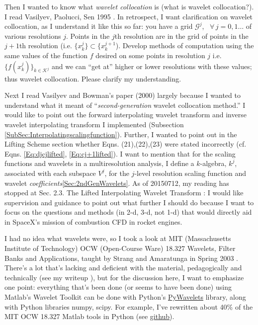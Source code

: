 \documentclass[twoside]{amsart}
\theoremstyle{plain}
\theoremstyle{definition}
\theoremstyle{remark}
\numberwithin{equation}{section}
\begin{document}
Then I wanted to know what \emph{wavelet collocation} is (what is wavelet collocation?).  I read Vasilyev, Paolucci, Sen 1995 \cite{OVasilyevSPaolucciMSen1995}.  In retrospect, I want clarification on wavelet collocation, as I understand it like this so far: you have a grid $\mathcal{G}^{j}$, \, $\forall \, j = 0 , 1 \dots $ of various resolutions $j$.  Points in the $j$th resolution are in the grid of points in the $j+1$th resolution (i.e. $\lbrace x^{j}_k \rbrace \subset \lbrace x^{j+1}_k$).  Develop methods of computation using the same values of the function $f$ desired on some points in resolution $j$ i.e. $\lbrace f(x^j_k) \rbrace_{k\in\mathcal{K}^j}$ and we can ``get at'' higher or lower resolutions with these values; thus wavelet collocation. Please clarify my understanding.  

Next I read Vasilyev and Bowman's paper (2000) \cite{OVasilyevCBowman2000} largely because I wanted to understand what it meant of ``\emph{second-generation} wavelet collocation method.''  I would like to point out the forward interpolating wavelet transform and inverse wavelet interpolating transform I implemented (Subsection \ref{SubSec:Interpolatingscalingfunction}).  Further, I wanted to point out in the Lifting Scheme section whether Eqns. (21),(22),(23) \cite{OVasilyevCBowman2000} were stated incorrectly (cf. Eqns. \ref{Eq:djcjlifted}, \ref{Eq:cj+1lifted}).  I want to mention that for the scaling functions and wavelets in a multiresolution analysis, I define a $k$-algebra, $k^j$, associated with each subspace $V^j$, for the $j$-level resolution scaling function and wavelet \emph{coefficients}\ref{Sec:2ndGenWavelets}.  As of 20150712, my reading has stopped at Sec. 2.3. The Lifted Interpolating Wavelet Transform \cite{OVasilyevCBowman2000}: I would like supervision and guidance to point out what further I should do because I want to focus on the questions and methods (in 2-d, 3-d, not 1-d) that would directly aid in SpaceX's mission of combustion CFD in rocket engines.   

I had no idea what wavelets were, so I took a look at MIT (Massachusetts Institute of Technology) OCW (Open-Course Ware) 18.327 Wavelets, Filter Banks and Applications, taught by Strang and Amaratunga in Spring 2003 \cite{GStrangKAmaratunga2003}.  There's a lot that's lacking and deficient with the material, pedagogically and technically (see my writeup \cite{EYeung2015}), but for the discussion here, I want to emphasize one point: everything that's been done (or seems to have been done) using Matlab's Wavelet Toolkit can be done with Python's \href{http://www.pybytes.com/pywavelets/}{PyWavelets} library, along with Python libraries numpy, scipy.  For example, I've rewritten about 40\% of the MIT OCW 18.327 Matlab tools in Python (see \href{https://github.com/ernestyalumni/18-327-wavelets-filter-banks}{github}).  
\end{document}
